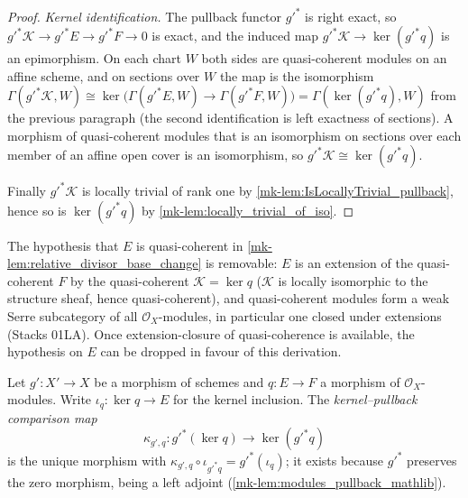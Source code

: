 \begin{proof}
  \emph{Kernel identification.}  The pullback functor \(g'^*\) is right
  exact, so \(g'^* \mathcal K \to g'^* E \to g'^* F \to 0\) is exact, and
  the induced map \(g'^* \mathcal K \to \ker(g'^* q)\) is an epimorphism.
  On each chart \(W\) both sides are quasi-coherent modules on an affine
  scheme, and on sections over \(W\) the map is the isomorphism
  \(\Gamma(g'^* \mathcal K, W) \cong
    \ker\bigl(\Gamma(g'^* E, W) \to \Gamma(g'^* F, W)\bigr)
    = \Gamma(\ker (g'^* q), W)\)
  from the previous paragraph (the second identification is left exactness
  of sections).  A morphism of quasi-coherent modules that is an
  isomorphism on sections over each member of an affine open cover is an
  isomorphism, so \(g'^* \mathcal K \cong \ker(g'^* q)\).

  Finally \(g'^* \mathcal K\) is locally trivial of rank one by
  \ref{mk-lem:IsLocallyTrivial_pullback}, hence so is \(\ker(g'^* q)\) by
  \ref{mk-lem:locally_trivial_of_iso}.
\end{proof}

\begin{remark}
  \label{mk-rem:relative_divisor_base_change_qcoh_removable}
  The hypothesis that \(E\) is quasi-coherent in
  \ref{mk-lem:relative_divisor_base_change} is removable: \(E\) is an
  extension of the quasi-coherent \(F\) by the quasi-coherent
  \(\mathcal K = \ker q\) (\(\mathcal K\) is locally isomorphic to the
  structure sheaf, hence quasi-coherent), and quasi-coherent modules form a
  weak Serre subcategory of all \(\mathcal O_X\)-modules, in particular one
  closed under extensions (Stacks 01LA). Once extension-closure of
  quasi-coherence is available, the hypothesis on \(E\) can be dropped in
  favour of this derivation.
\end{remark}

\begin{definition}
  \label{mk-def:pullback_kernel_comparison}
  \leanok

  Let \(g' : X' \to X\) be a morphism of schemes and \(q : E \to F\) a
  morphism of \(\mathcal O_X\)-modules. Write \(\iota_q : \ker q \to E\) for
  the kernel inclusion. The \emph{kernel--pullback comparison map}
  \[
    \kappa_{g',q} : g'^{*}(\ker q) \longrightarrow \ker(g'^{*} q)
  \]
  is the unique morphism with
  \(\kappa_{g',q} \circ \iota_{g'^{*}q} = g'^{*}(\iota_q)\); it exists
  because \(g'^{*}\) preserves the zero morphism, being a left adjoint
  (\ref{mk-lem:modules_pullback_mathlib}).
\end{definition}

